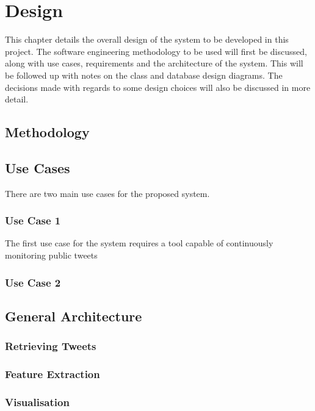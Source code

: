 \chapter{Design}
\label{cha:design}
This chapter details the overall design of the system to be developed in this project. The software engineering methodology to be used will first be discussed, along with use cases, requirements and the architecture of the system. This will be followed up with notes on the class and database design diagrams. The decisions made with regards to some design choices will also be discussed in more detail.

\section{Methodology}

\section{Use Cases}
There are two main use cases for the proposed system.

\subsection{Use Case 1}
The first use case for the system requires a tool capable of continuously monitoring public tweets

\subsection{Use Case 2}

\section{General Architecture}

\subsection{Retrieving Tweets}
\subsection{Feature Extraction}
\subsection{Visualisation}

